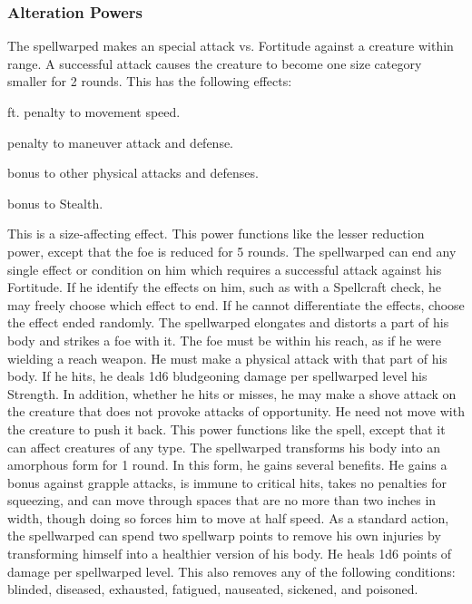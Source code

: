 \subsubsection{Alteration Powers}
 The spellwarped makes an special attack vs. Fortitude against a creature within \rngclose range. A successful attack causes the creature to become one size category smaller for 2 rounds. This has the following effects:
  \begin{itemize*} 
    \item {} ft. penalty to movement speed.
    \item {} penalty to maneuver attack and defense.
    \item {} bonus to other physical attacks and defenses.
    \item {} bonus to Stealth.
  \end{itemize*}
This is a size-affecting effect.
 This power functions like the lesser reduction power, except that the foe is reduced for 5 rounds.
 The spellwarped can end any single effect or condition on him which requires a successful attack against his Fortitude. If he identify the effects on him, such as with a Spellcraft check, he may freely choose which effect to end. If he cannot differentiate the effects, choose the effect ended randomly.
 The spellwarped elongates and distorts a part of his body and strikes a foe with it. The foe must be within his reach, as if he were wielding a reach weapon. He must make a physical attack with that part of his body. If he hits, he deals 1d6 bludgeoning damage per spellwarped level \add his Strength. In addition, whether he hits or misses, he may make a shove attack on the creature that does not provoke attacks of opportunity. He need not move with the creature to push it back.
 This power functions like the  spell, except that it can affect creatures of any type.
 The spellwarped transforms his body into an amorphous form for 1 round. In this form, he gains several benefits. He gains a  bonus against grapple attacks, is immune to critical hits, takes no penalties for squeezing, and can move through spaces that are no more than two inches in width, though doing so forces him to move at half speed.
 As a standard action, the spellwarped can spend two spellwarp points to remove his own injuries by transforming himself into a healthier version of his body. He heals 1d6 points of damage per spellwarped level. This also removes any of the following conditions: blinded, diseased, exhausted, fatigued, nauseated, sickened, and poisoned.
